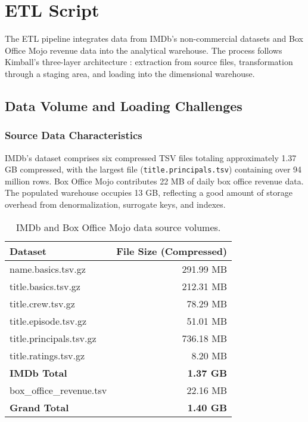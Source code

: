 \section{ETL Script}

The ETL pipeline integrates data from IMDb's non-commercial datasets and Box Office Mojo revenue data into the analytical warehouse. The process follows Kimball's three-layer architecture \cite{kimball2004etl}: extraction from source files, transformation through a staging area, and loading into the dimensional warehouse.

\subsection{Data Volume and Loading Challenges}

\subsubsection{Source Data Characteristics}

IMDb's dataset comprises six compressed TSV files totaling approximately 1.37 GB compressed, with the largest file (\texttt{title.principals.tsv}) containing over 94 million rows. Box Office Mojo contributes 22 MB of daily box office revenue data. The populated warehouse occupies 13 GB, reflecting a good amount of storage overhead from denormalization, surrogate keys, and indexes.

\begin{table}[h]
  \centering
  \caption{IMDb and Box Office Mojo data source volumes.}
  \label{tab:etl-volumes}
  \begin{tabular}{lr}
    \toprule
    \textbf{Dataset} & \textbf{File Size (Compressed)} \\
    \midrule
    name.basics.tsv.gz       & 291.99 MB \\
    title.basics.tsv.gz      & 212.31 MB \\
    title.crew.tsv.gz        & 78.29 MB \\
    title.episode.tsv.gz     & 51.01 MB \\
    title.principals.tsv.gz  & 736.18 MB \\
    title.ratings.tsv.gz     & 8.20 MB \\
    \midrule
    \textbf{IMDb Total}      & \textbf{1.37 GB} \\
    \midrule
    box\_office\_revenue.tsv & 22.16 MB \\
    \midrule
    \textbf{Grand Total}     & \textbf{1.40 GB} \\
    \bottomrule
  \end{tabular}
\end{table}


